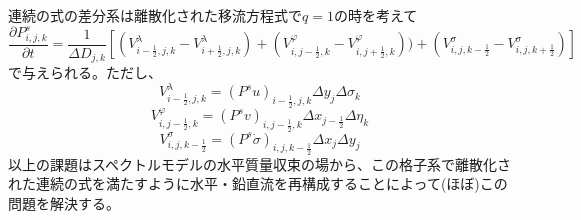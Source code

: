 \documentclass{jsbook}
\begin{document}
連続の式の差分系は離散化された移流方程式で$q=1$の時を考えて
\begin{equation}
  \frac{\partial P^{s}_{i,j,k} }{\partial t}=\frac{1}{\Delta D_{j,k}}[(V^{\lambda}_{i-\frac{1}{2},j,k}-V^{\lambda}_{i+\frac{1}{2},j,k})+(V^{\varphi}_{i,j-\frac{1}{2},k}-V^{\varphi}_{i,j+\frac{1}{2},k}))+(V^{\sigma}_{i,j,k-\frac{1}{2}}-V^{\sigma}_{i,j,k+\frac{1}{2}})]
\end{equation}
で与えられる。ただし、
\begin{equation}
  V^{\lambda}_{i-\frac{1}{2},j,k}=(P^{s}u)_{i-\frac{1}{2},j,k} \Delta y_{j} \Delta \sigma_{k}
\end{equation}
\begin{equation}
  V^{\varphi}_{i,j-\frac{1}{2},k}=(P^{s}v)_{i,j-\frac{1}{2},k} \Delta x_{j-\frac{1}{2}} \Delta \eta_{k}
\end{equation}
\begin{equation}
  V^{\sigma}_{i,j,k-\frac{1}{2}}=(P^{s}\dot{\sigma})_{i,j,k-\frac{1}{2}} \Delta x_{j} \Delta y_{j}
\end{equation}
以上の課題はスペクトルモデルの水平質量収束の場から、この格子系で離散化された連続の式を満たすように水平・鉛直流を再構成することによって(ほぼ)この問題を解決する。
\end{document}
